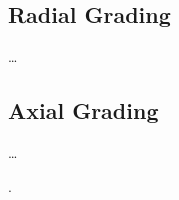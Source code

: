 \subsection{Radial Grading}
\dots

\subsection{Axial Grading}
\dots

\clearpage 

%
%
%
.
%
%
%
%
%
